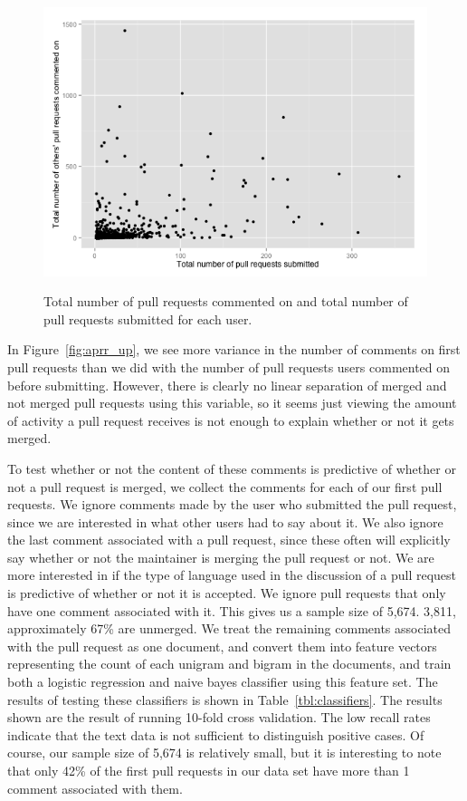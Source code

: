 \documentclass{iitthesis}
\begin{document}
\begin{figure}[p] \centering \label{fig:commented_pullrequests_totals}
\includegraphics[scale=0.6]{figures/commented_pullrequests_totals_ggplot.png}
\caption{Total number of pull requests commented on and total number of pull
requests submitted for each user.} \end{figure}

In Figure~\ref{fig:aprr_up}, we see more variance in the number of comments on
first pull requests than we did with the number of pull requests users commented
on before submitting. However, there is clearly no linear separation of merged
and not merged pull requests using this variable, so it seems just viewing the
amount of activity a pull request receives is not enough to explain whether or
not it gets merged.

To test whether or not the content of these comments is predictive of whether or
not a pull request is merged, we collect the comments for each of our first pull
requests. We ignore comments made by the user who submitted the pull request,
since we are interested in what other users had to say about it. We also ignore
the last comment associated with a pull request, since these often will
explicitly say whether or not the maintainer is merging the pull request or not.
We are more interested in if the type of language used in the discussion of a
pull request is predictive of whether or not it is accepted. We ignore pull
requests that only have one comment associated with it. This gives us a sample
size of 5,674. 3,811, approximately 67\% are unmerged. We treat the remaining
comments associated with the pull request as one document, and convert them into
feature vectors representing the count of each unigram and bigram in the
documents, and train both a logistic regression and naive bayes classifier using
this feature set. The results of testing these classifiers is shown in
Table~\ref{tbl:classifiers}. The results shown are the result of running 10-fold
cross validation. The low recall rates indicate that the text data is not
sufficient to distinguish positive cases. Of course, our sample size of 5,674 is
relatively small, but it is interesting to note that only 42\% of the first pull
requests in our data set have more than 1 comment associated with them.
\end{document}
